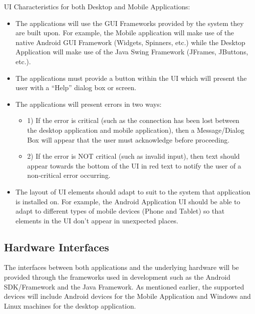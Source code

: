 \documentclass{article}
\begin{document}
UI Characteristics for both Desktop and Mobile Applications:
\begin{itemize}
\item The applications will use the GUI Frameworks provided by the system they are built upon. For example, the Mobile application will make use of the native Android GUI Framework (Widgets, Spinners, etc.) while the Desktop Application will make use of the Java Swing Framework (JFrames, JButtons, etc.).
\item The applications must provide a button within the UI which will present the user with a “Help” dialog box or screen.
\item The applications will present errors in two ways:
\begin{itemize}
\item 1) If the error is critical (such as the connection has been lost between the desktop application and mobile application), then a Message/Dialog Box will appear that the user must acknowledge before proceeding.
\item 2) If the error is NOT critical (such as invalid input), then text should appear towards the bottom of the UI in red text to notify the user of a non-critical error occurring.
\end{itemize}
\item The layout of UI elements should adapt to suit to the system that application is installed on. For example, the Android Application UI should be able to adapt to different types of mobile devices (Phone and Tablet) so that elements in the UI don’t appear in unexpected places.
\end{itemize}



\subsection{Hardware Interfaces}

The interfaces between both applications and the underlying hardware will be provided through the frameworks used in development such as the Android SDK/Framework and the Java Framework. As mentioned earlier, the supported devices will include Android devices for the Mobile Application and Windows and Linux machines for the desktop application. 
\end{document}
